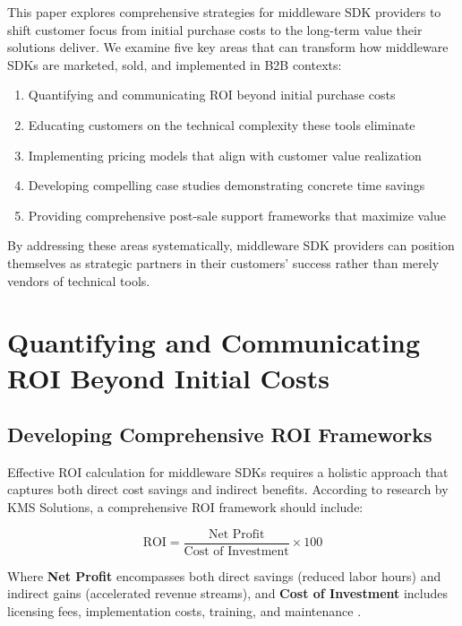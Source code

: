 \documentclass[11pt,a4paper]{article}
\begin{document}
This paper explores comprehensive strategies for middleware SDK providers to shift customer focus from initial purchase costs to the long-term value their solutions deliver. We examine five key areas that can transform how middleware SDKs are marketed, sold, and implemented in B2B contexts:

\begin{enumerate}
    \item Quantifying and communicating ROI beyond initial purchase costs
    \item Educating customers on the technical complexity these tools eliminate
    \item Implementing pricing models that align with customer value realization
    \item Developing compelling case studies demonstrating concrete time savings
    \item Providing comprehensive post-sale support frameworks that maximize value
\end{enumerate}

By addressing these areas systematically, middleware SDK providers can position themselves as strategic partners in their customers' success rather than merely vendors of technical tools.

\section{Quantifying and Communicating ROI Beyond Initial Costs}

\subsection{Developing Comprehensive ROI Frameworks}

Effective ROI calculation for middleware SDKs requires a holistic approach that captures both direct cost savings and indirect benefits. According to research by KMS Solutions, a comprehensive ROI framework should include:

\begin{equation}
\text{ROI} = \frac{\text{Net Profit}}{\text{Cost of Investment}} \times 100
\end{equation}

Where \textbf{Net Profit} encompasses both direct savings (reduced labor hours) and indirect gains (accelerated revenue streams), and \textbf{Cost of Investment} includes licensing fees, implementation costs, training, and maintenance \citep{kms2025measure}.
\end{document}
